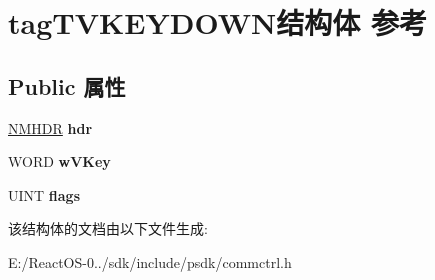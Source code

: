 \hypertarget{structtag_t_v_k_e_y_d_o_w_n}{}\section{tag\+T\+V\+K\+E\+Y\+D\+O\+W\+N结构体 参考}
\label{structtag_t_v_k_e_y_d_o_w_n}
\subsection*{Public 属性}
\begin{DoxyCompactItemize}
\item 
\mbox{\label{structtag_t_v_k_e_y_d_o_w_n_a433c8edb8a8743da47c11e015b7b9590}} 
\hyperlink{structtag_n_m_h_d_r}{N\+M\+H\+DR} {\bfseries hdr}
\item 
\mbox{\label{structtag_t_v_k_e_y_d_o_w_n_ab6ee132f3e7405c5cb7655eb9cdfef7b}} 
W\+O\+RD {\bfseries w\+V\+Key}
\item 
\mbox{\label{structtag_t_v_k_e_y_d_o_w_n_a07c439f110993ff05f3d3ea52737bab0}} 
U\+I\+NT {\bfseries flags}
\end{DoxyCompactItemize}


该结构体的文档由以下文件生成\+:\begin{DoxyCompactItemize}
\item 
E\+:/\+React\+O\+S-\/0../sdk/include/psdk/commctrl.\+h\end{DoxyCompactItemize}
